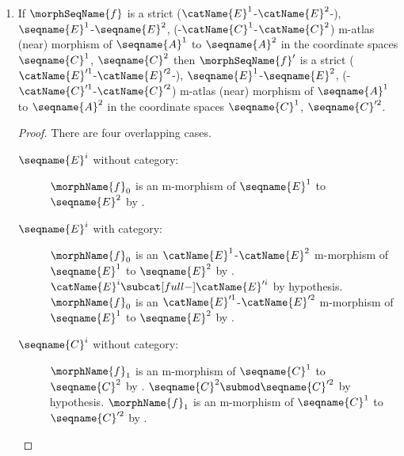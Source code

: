 \documentclass{article}
\begin{document}
\begin{lemma}
\begin{enumerate}
\begin{proof}
\begin{description}
\item[$\seqname{C}^i$ without category:]
$\morphName{f}_1$ is a (strict) local m-morphism of $\seqname{C}^1$ to
$\seqname{C}^2$ by .
$\seqname{C}^2 \submod \seqname{C}'^2$ by hypothesis.
$\morphName{f}_1$ is a (strict) local m-morphism of $\seqname{C}^1$ to
$\seqname{C}'^2$ by .

\item[$\seqname{C}^i$ with category:]
$\morphName{f}_0$ is a local $\catName{C}^1$-$\catName{C}^2$
m-morphism of $\seqname{C}^1$ to $\seqname{C}^2$ by
.
$\catName{C}^i \subcat[full-] \catName{C}'^i$ by hypothesis.
$\morphName{f}_0$ is a (strict) local $\catName{C}'^1$-$\catName{C}'^2$
m-morphism of $\seqname{C}^1$ to $\seqname{C}^2$ by
.
\end{description}
\end{proof}

\item
\label{M-ATLmorph:strictisstricttosup}
If $\morphSeqName{f}$ is a strict
\nobreaks
  {
    {($\catName{E}^1$-$\catName{E}^2$-)},
    {$\seqname{E}^1$-$\seqname{E}^2$},
    {(-$\catName{C}^1$-$\catName{C}^2$)}
  }
m-atlas (near) morphism of $\seqname{A}^1$ to $\seqname{A}^2$ in the
coordinate spaces $\seqname{C}^1$, $\seqname{C}^2$ then
$\morphSeqName{f}'$ is a strict
\nobreaks
  {
    {($\catName{E}'^1$-$\catName{E}'^2$-)},
    {$\seqname{E}^1$-$\seqname{E}^2$},
    {(-$\catName{C}'^1$-$\catName{C}'^2$)}
  }
m-atlas (near) morphism of $\seqname{A}^1$ to $\seqname{A}^2$ in the
coordinate spaces $\seqname{C}^1$, $\seqname{C}'^2$.

\begin{proof}
There are four overlapping cases.
\begin{description}
\item[$\seqname{E}^i$ without category:]
$\morphName{f}_0$ is an m-morphism of $\seqname{E}^1$ to
$\seqname{E}^2$ by .

\item[$\seqname{E}^i$ with category:]
$\morphName{f}_0$ is an $\catName{E}^1$-$\catName{E}^2$
m-morphism of $\seqname{E}^1$ to $\seqname{E}^2$ by
.
$\catName{E}^i \subcat[full-] \catName{E}'^i$ by hypothesis.
$\morphName{f}_0$ is an $\catName{E}'^1$-$\catName{E}'^2$
m-morphism of $\seqname{E}^1$ to $\seqname{E}^2$ by
.

\item[$\seqname{C}^i$ without category:]
$\morphName{f}_1$ is an m-morphism of $\seqname{C}^1$ to
$\seqname{C}^2$ by .
$\seqname{C}^2 \submod \seqname{C}'^2$ by hypothesis.
$\morphName{f}_1$ is an m-morphism of $\seqname{C}^1$ to
$\seqname{C}'^2$ by .


\end{description}
\end{proof}
\end{enumerate}
\end{lemma}
\end{document}
